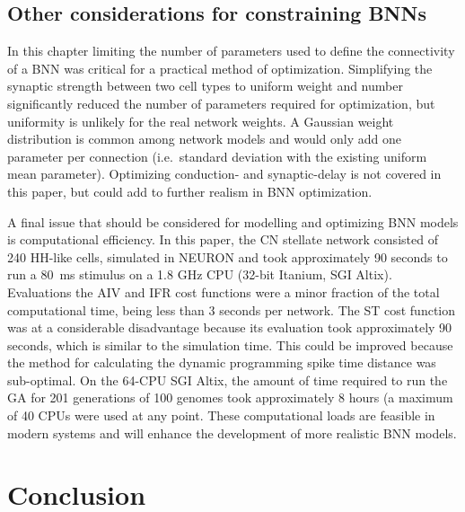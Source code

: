 
\smallskip{}


\subsection{Other considerations for constraining BNNs}\label{sec:GA:other-considerations}


In this chapter limiting the number of parameters used to define the connectivity
of a BNN was critical for a practical method of optimization. Simplifying the
synaptic strength between two cell types to uniform weight and number
significantly reduced the number of parameters required for optimization, but
uniformity is unlikely for the real network weights.  A Gaussian weight
distribution is common among network models and would only add one parameter per
connection (i.e.\ standard deviation with the existing uniform mean parameter).
Optimizing conduction- and synaptic-delay is not covered in this paper, but
could add to further realism in BNN optimization.

\smallskip{}

A final issue that should be considered for modelling and optimizing BNN models
is computational efficiency. In this paper, the CN stellate network consisted of
240 HH-like cells, simulated in NEURON and took approximately 90 seconds to run
a 80~ms stimulus on a 1.8 GHz CPU (32-bit Itanium, SGI Altix).  Evaluations the
AIV and IFR cost functions were a minor fraction of the total computational
time, being less than 3 seconds per network. The ST cost function was at a
considerable disadvantage because its evaluation took approximately 90 seconds,
which is similar to the simulation time. This could be improved because the
method for calculating the dynamic programming spike time distance was
sub-optimal.  On the 64-CPU SGI Altix, the amount of time required to run the GA
for 201 generations of 100 genomes took approximately 8 hours (a maximum of 40
CPUs were used at any point.  These computational loads are feasible in modern
systems and will enhance the development of more realistic BNN models.


\section{Conclusion}\label{sec:GA:conclusion}

